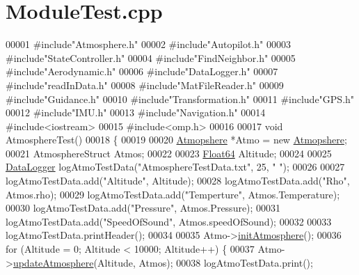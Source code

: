 \hypertarget{_module_test_8cpp_source}{}\section{Module\+Test.\+cpp}
\label{_module_test_8cpp_source}

\begin{DoxyCode}
00001 \textcolor{preprocessor}{#include"Atmosphere.h"}
00002 \textcolor{preprocessor}{#include"Autopilot.h"}
00003 \textcolor{preprocessor}{#include"StateController.h"}
00004 \textcolor{preprocessor}{#include"FindNeighbor.h"}
00005 \textcolor{preprocessor}{#include"Aerodynamic.h"}
00006 \textcolor{preprocessor}{#include"DataLogger.h"}
00007 \textcolor{preprocessor}{#include"readInData.h"}
00008 \textcolor{preprocessor}{#include"MatFileReader.h"}
00009 \textcolor{preprocessor}{#include"Guidance.h"}
00010 \textcolor{preprocessor}{#include"Transformation.h"}
00011 \textcolor{preprocessor}{#include"GPS.h"}
00012 \textcolor{preprocessor}{#include"IMU.h"}
00013 \textcolor{preprocessor}{#include"Navigation.h"}
00014 \textcolor{preprocessor}{#include<iostream>}
00015 \textcolor{preprocessor}{#include<omp.h>}
00016 
00017 \textcolor{keywordtype}{void} AtmosphereTest()
00018 \{
00019 
00020     \hyperlink{group___atmosphere_class_atmopshere}{Atmopshere} *Atmo = \textcolor{keyword}{new} \hyperlink{group___atmosphere_class_atmopshere}{Atmopshere};
00021     AtmosphereStruct Atmos;
00022 
00023     \hyperlink{group___tools_ga3f1431cb9f76da10f59246d1d743dc2c}{Float64} Altitude;
00024 
00025     \hyperlink{group___tools_class_data_logger}{DataLogger} logAtmoTestData(\textcolor{stringliteral}{"AtmosphereTestData.txt"}, 25, \textcolor{stringliteral}{" "});
00026 
00027     logAtmoTestData.add(\textcolor{stringliteral}{"Altitude"}, Altitude);
00028     logAtmoTestData.add(\textcolor{stringliteral}{"Rho"}, Atmos.rho);
00029     logAtmoTestData.add(\textcolor{stringliteral}{"Temperture"}, Atmos.Temperature);
00030     logAtmoTestData.add(\textcolor{stringliteral}{"Pressure"}, Atmos.Pressure);
00031     logAtmoTestData.add(\textcolor{stringliteral}{"SpeedOfSound"}, Atmos.speedOfSound);
00032 
00033     logAtmoTestData.printHeader();
00034 
00035     Atmo->\hyperlink{group___atmosphere_a6e1d5763fbb6631784c99ee3c88911bd}{initAtmosphere}();
00036     \textcolor{keywordflow}{for} (Altitude = 0; Altitude < 10000; Altitude++) \{
00037         Atmo->\hyperlink{group___atmosphere_a2bd97471d32725d6196ee6816ea36c99}{updateAtmosphere}(Altitude, Atmos);
00038         logAtmoTestData.print();

\end{DoxyCode}
